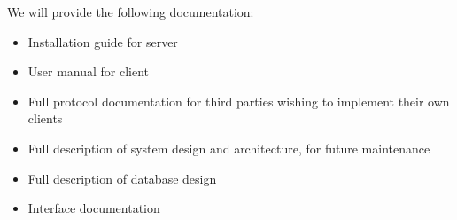 We will provide the following documentation:
\begin{itemize}
\item Installation guide for server
\item User manual for client
\item Full protocol documentation for third parties wishing to implement their
      own clients
\item Full description of system design and architecture, for future
      maintenance
\item Full description of database design
\item Interface documentation
\end{itemize}
